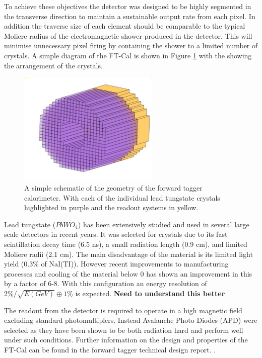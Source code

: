 To achieve these objectives the detector was designed to be highly segmented in the transverse direction to maintain a sustainable output rate from each pixel. In addition the traverse size of each element should be comparable to the typical Moliere radius of the electromagnetic shower produced in the detector. This will minimise unnecessary pixel firing by containing the shower to a limited number of crystals. A simple diagram of the FT-Cal is shown in Figure \ref{ftcalo} with the showing the arrangement of the crystals.

\begin{figure}
	\centering
	\includegraphics[width=0.6\textwidth]{ImgChap1/ftcalo}
	\caption{A simple schematic of the geometry of the forward tagger calorimeter. With each of the individual lead tungstate crystals highlighted in purple and the readout systems in yellow. \cite{FTTDR2012}}
	\label{ftcalo}
\end{figure}


Lead tungstate ($PbWO_{4}$) has been extensively studied and used in several large scale detectors in recent years. \cite{zhou2007phos,erni2008technical}It was selected for crystals due to its fast scintillation decay time (6.5 ns), a small radiation length (0.9 cm), and limited Moliere radii (2.1 cm). The main disadvantage of the material is its limited light yield ($0.3\%$ of NaI(TI)). However recent improvements to manufacturing processes and cooling of the material below 0 has shown an improvement in this by a factor of 6-8. With this configuration an energy resolution of $2\% / \sqrt{E(GeV)} \oplus 1\%$ is expected. \textbf{Need to understand this better} \cite{FTTDR2012}

The readout from the detector is required to operate in a high magnetic field excluding standard photomultiplers. Instead Avalanche Photo Diodes (APD) were selected as they have been shown to be both radiation hard and perform well under such conditions. Further information on the design and properties of the FT-Cal can be found in the forward tagger technical design report. \cite{FTTDR2012}.


